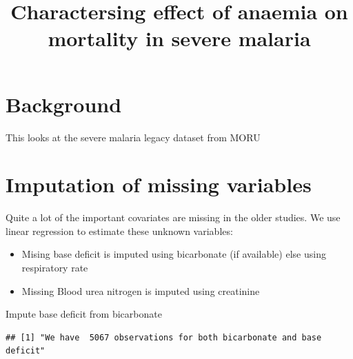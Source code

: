 \documentclass[]{article}
\title{Charactersing effect of anaemia on mortality in severe malaria}
\author{}
\date{}
\newenvironment{Shaded}{\begin{snugshade}}{\end{snugshade}}
\newcommand{\KeywordTok}[1]{\textcolor[rgb]{0.13,0.29,0.53}{\textbf{#1}}}
\newcommand{\StringTok}[1]{\textcolor[rgb]{0.31,0.60,0.02}{#1}}
\newcommand{\OperatorTok}[1]{\textcolor[rgb]{0.81,0.36,0.00}{\textbf{#1}}}
\newcommand{\NormalTok}[1]{#1}
\providecommand{\tightlist}{%
  \setlength{\itemsep}{0pt}\setlength{\parskip}{0pt}}
\begin{document}
\maketitle

{
\setcounter{tocdepth}{2}
\tableofcontents
}
\section{Background}\label{background}

This looks at the severe malaria legacy dataset from MORU

\section{Imputation of missing
variables}\label{imputation-of-missing-variables}

Quite a lot of the important covariates are missing in the older
studies. We use linear regression to estimate these unknown variables:

\begin{itemize}
\tightlist
\item
  Mising base deficit is imputed using bicarbonate (if available) else
  using respiratory rate
\item
  Missing Blood urea nitrogen is imputed using creatinine
\end{itemize}

Impute base deficit from bicarbonate

\begin{Shaded}
\end{Shaded}

\begin{verbatim}
## [1] "We have  5067 observations for both bicarbonate and base deficit"
\end{verbatim}
\end{document}
